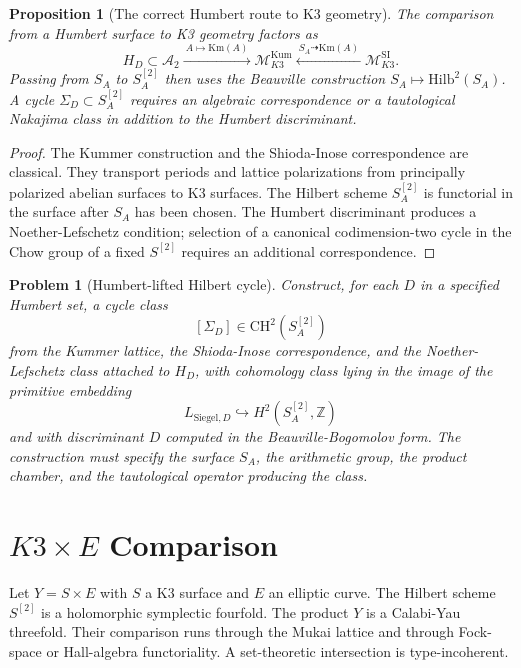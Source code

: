 \documentclass[11pt]{article}
\newtheorem{proposition}[theorem]{Proposition}
\newtheorem{problem}[theorem]{Problem}
\providecommand{\Z}{\mathbb{Z}}
\providecommand{\cA}{\mathcal{A}}
\providecommand{\cM}{\mathcal{M}}
\providecommand{\CH}{\mathrm{CH}}
\providecommand{\Hilb}{\mathrm{Hilb}}
\providecommand{\Km}{\mathrm{Km}}
\begin{document}
\begin{proposition}[The correct Humbert route to K3 geometry]
\label{prop:humbert-route}
The comparison from a Humbert surface to K3 geometry factors as
\[
  H_D\subset\cA_2
  \xrightarrow{\ A\mapsto\Km(A)\ }
  \cM_{K3}^{\mathrm{Kum}}
  \xleftarrow{\ S_A\dashrightarrow\Km(A)\ }
  \cM_{K3}^{\mathrm{SI}}.
\]
Passing from \(S_A\) to \(S_A^{[2]}\) then uses the Beauville
construction \(S_A\mapsto\Hilb^2(S_A)\).  A cycle
\(\Sigma_D\subset S_A^{[2]}\) requires an algebraic correspondence or a
tautological Nakajima class in addition to the Humbert discriminant.
\end{proposition}

\begin{proof}
The Kummer construction and the Shioda-Inose correspondence are
classical.  They transport periods and lattice polarizations from
principally polarized abelian surfaces to K3 surfaces.  The Hilbert
scheme \(S_A^{[2]}\) is functorial in the surface after \(S_A\) has been
chosen.  The Humbert discriminant produces a Noether-Lefschetz
condition; selection of a canonical codimension-two cycle in the Chow
group of a fixed \(S^{[2]}\) requires an additional correspondence.
\end{proof}

\begin{problem}[Humbert-lifted Hilbert cycle]
\label{prob:humbert-hilbert-cycle}
Construct, for each \(D\) in a specified Humbert set, a cycle class
\[
  [\Sigma_D]\in\CH^2(S_A^{[2]})
\]
from the Kummer lattice, the Shioda-Inose correspondence, and the
Noether-Lefschetz class attached to \(H_D\), with cohomology class
lying in the image of the primitive embedding
\[
  L_{\mathrm{Siegel},D}\hookrightarrow
  H^2(S_A^{[2]},\Z)
\]
and with discriminant \(D\) computed in the Beauville-Bogomolov form.
The construction must specify the surface \(S_A\), the arithmetic group,
the product chamber, and the tautological operator producing the class.
\end{problem}

\section{\texorpdfstring{\(K3\times E\)}{K3xE} Comparison}

Let \(Y=S\times E\) with \(S\) a K3 surface and \(E\) an elliptic curve.
The Hilbert scheme \(S^{[2]}\) is a holomorphic symplectic fourfold.
The product \(Y\) is a Calabi-Yau threefold.  Their comparison runs
through the Mukai lattice and through Fock-space or Hall-algebra
functoriality.  A set-theoretic intersection is type-incoherent.
\end{document}
